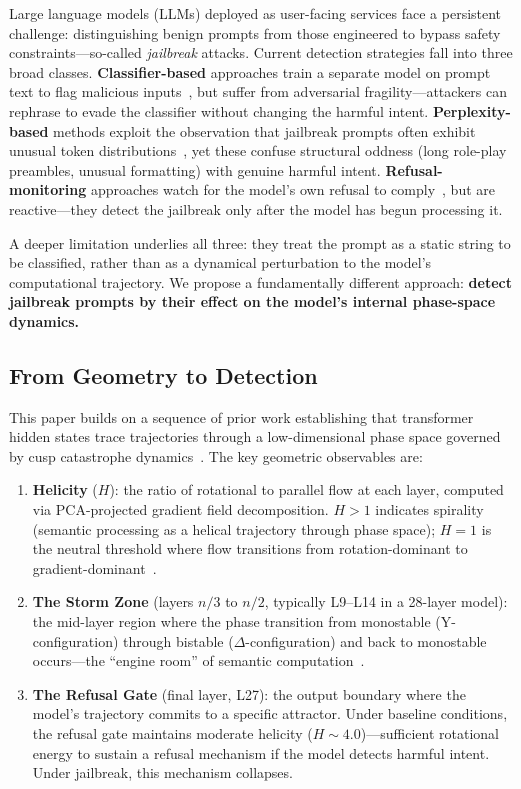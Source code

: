 \documentclass[12pt,a4paper]{article}
\begin{document}
Large language models (LLMs) deployed as user-facing services face a persistent challenge: distinguishing benign prompts from those engineered to bypass safety constraints---so-called \textit{jailbreak} attacks. Current detection strategies fall into three broad classes. \textbf{Classifier-based} approaches train a separate model on prompt text to flag malicious inputs~\cite{inanyear2023}, but suffer from adversarial fragility---attackers can rephrase to evade the classifier without changing the harmful intent. \textbf{Perplexity-based} methods exploit the observation that jailbreak prompts often exhibit unusual token distributions~\cite{inanyear2024}, yet these confuse structural oddness (long role-play preambles, unusual formatting) with genuine harmful intent. \textbf{Refusal-monitoring} approaches watch for the model's own refusal to comply~\cite{inanyear2025}, but are reactive---they detect the jailbreak only after the model has begun processing it.

A deeper limitation underlies all three: they treat the prompt as a static string to be classified, rather than as a dynamical perturbation to the model's computational trajectory. We propose a fundamentally different approach: \textbf{detect jailbreak prompts by their effect on the model's internal phase-space dynamics.}

\subsection{From Geometry to Detection}

This paper builds on a sequence of prior work establishing that transformer hidden states trace trajectories through a low-dimensional phase space governed by cusp catastrophe dynamics~\cite{DR_MM_2025a,DR_MM_2025b,DR_MM_2025c,DR_MM_2025d}. The key geometric observables are:

\begin{enumerate}[leftmargin=*]
    \item \textbf{Helicity} ($H$): the ratio of rotational to parallel flow at each layer, computed via PCA-projected gradient field decomposition. $H > 1$ indicates spirality (semantic processing as a helical trajectory through phase space); $H = 1$ is the neutral threshold where flow transitions from rotation-dominant to gradient-dominant~\cite{DR_MM_2025c}.
    \item \textbf{The Storm Zone} (layers $n/3$ to $n/2$, typically L9--L14 in a 28-layer model): the mid-layer region where the phase transition from monostable (Y-configuration) through bistable ($\Delta$-configuration) and back to monostable occurs---the ``engine room'' of semantic computation~\cite{DR_MM_2025b}.
    \item \textbf{The Refusal Gate} (final layer, L27): the output boundary where the model's trajectory commits to a specific attractor. Under baseline conditions, the refusal gate maintains moderate helicity ($H \sim 4.0$)---sufficient rotational energy to sustain a refusal mechanism if the model detects harmful intent. Under jailbreak, this mechanism collapses.
\end{enumerate}
\end{document}
